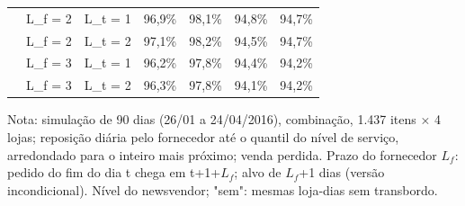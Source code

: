 \begin{table}[htbp]
\begin{tabular}{lllrrrr}
 & L\_f = 2 & L\_t = 1 & 96,9\% & 98,1\% & 94,8\% & 94,7\% \\
 & L\_f = 2 & L\_t = 2 & 97,1\% & 98,2\% & 94,5\% & 94,7\% \\
 & L\_f = 3 & L\_t = 1 & 96,2\% & 97,8\% & 94,4\% & 94,2\% \\
 & L\_f = 3 & L\_t = 2 & 96,3\% & 97,8\% & 94,1\% & 94,2\% \\
\bottomrule
\end{tabular}
\par\smallskip
{\footnotesize Nota: simulação de 90 dias (26/01 a 24/04/2016), combinação, 1.437 itens × 4 lojas; reposição diária pelo fornecedor até o quantil do nível de serviço, arredondado para o inteiro mais próximo; venda perdida. Prazo do fornecedor $L_f$: pedido do fim do dia t chega em t+1+$L_f$; alvo de $L_f$+1 dias (versão incondicional). Nível do newsvendor; "sem": mesmas loja-dias sem transbordo.}
\end{table}
